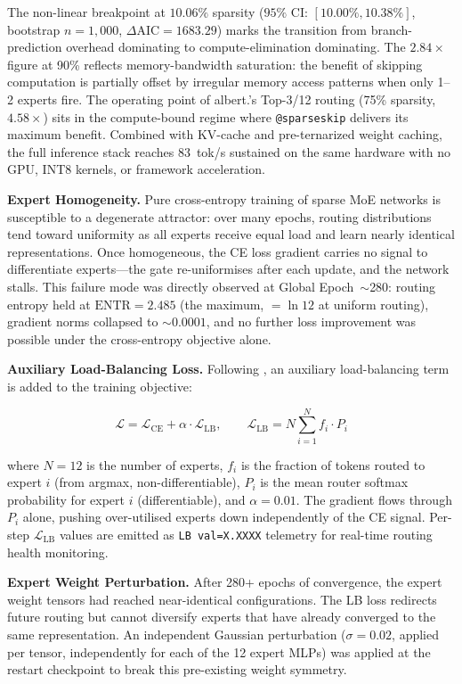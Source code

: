 \documentclass[journal,10pt,twocolumn]{IEEEtran}
\begin{document}
\noindent The non-linear breakpoint at $10.06\%$ sparsity
($95\%$ CI: $[10.00\%, 10.38\%]$, bootstrap $n=1{,}000$,
$\Delta\text{AIC} = 1683.29$) marks the transition from branch-prediction
overhead dominating to compute-elimination dominating. The $2.84\times$ figure
at 90\% reflects memory-bandwidth saturation: the benefit of skipping
computation is partially offset by irregular memory access patterns when only
1--2 experts fire. The operating point of albert.'s Top-3/12 routing
(75\% sparsity, $4.58\times$) sits in the compute-bound regime where
\texttt{@sparseskip} delivers its maximum benefit. Combined with KV-cache and
pre-ternarized weight caching, the full inference stack reaches 83~tok/s
sustained on the same hardware with no GPU, INT8 kernels, or framework
acceleration.

\textbf{Expert Homogeneity.}
Pure cross-entropy training of sparse MoE networks is susceptible to a
degenerate attractor: over many epochs, routing distributions tend toward
uniformity as all experts receive equal load and learn nearly identical
representations. Once homogeneous, the CE loss gradient carries no signal to
differentiate experts---the gate re-uniformises after each update, and the
network stalls. This failure mode was directly observed at Global
Epoch~$\sim$280: routing entropy held at $\text{ENTR} = 2.485$ (the maximum,
$= \ln 12$ at uniform routing), gradient norms collapsed to
${\sim}0.0001$, and no further loss improvement was possible under the
cross-entropy objective alone.

\textbf{Auxiliary Load-Balancing Loss.}
Following \cite{fedus2022switch}, an auxiliary load-balancing term is added
to the training objective:

\begin{equation}
  \mathcal{L} = \mathcal{L}_\text{CE} + \alpha \cdot \mathcal{L}_\text{LB},
  \qquad
  \mathcal{L}_\text{LB} = N \sum_{i=1}^{N} f_i \cdot P_i
  \label{eq:lb_loss}
\end{equation}

\noindent where $N = 12$ is the number of experts, $f_i$ is the fraction of
tokens routed to expert $i$ (from argmax, non-differentiable), $P_i$ is the
mean router softmax probability for expert $i$ (differentiable), and
$\alpha = 0.01$. The gradient flows through $P_i$ alone, pushing
over-utilised experts down independently of the CE signal. Per-step
$\mathcal{L}_\text{LB}$ values are emitted as \texttt{LB val=X.XXXX}
telemetry for real-time routing health monitoring.

\textbf{Expert Weight Perturbation.}
After 280+ epochs of convergence, the expert weight tensors had reached
near-identical configurations. The LB loss redirects future routing but cannot
diversify experts that have already converged to the same representation.
An independent Gaussian perturbation ($\sigma = 0.02$, applied per tensor,
independently for each of the 12 expert MLPs) was applied at the restart
checkpoint to break this pre-existing weight symmetry.
\end{document}
